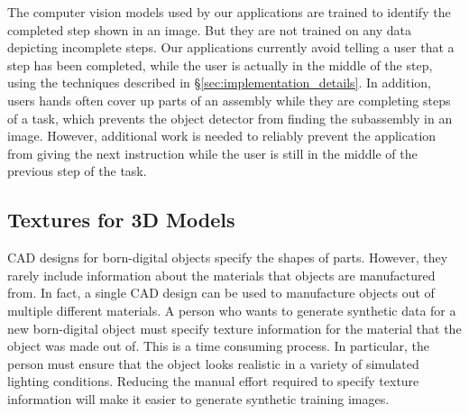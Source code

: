 The computer vision models used by our applications are trained to identify the
completed step shown in an image.
But they are not trained on any data depicting incomplete steps.
Our applications currently avoid telling a user that a step has been completed,
while the user is actually in the middle of the step, using the techniques
described in \S\ref{sec:implementation_details}.
In addition, users hands often cover up parts of an assembly while they
are completing steps of a task, which prevents the object detector from finding
the subassembly in an image.
However, additional work is needed to reliably prevent the application from
giving the next instruction while the user is still in the middle of the
previous step of the task.

\subsection{Textures for 3D Models}

CAD designs for born-digital objects specify the shapes of parts.
However, they rarely include information about the materials that objects are
manufactured from.
In fact, a single CAD design can be used to manufacture objects out of multiple
different materials.
A person who wants to generate synthetic data for a new born-digital object must
specify texture information for the material that the object was made out of.
This is a time consuming process.
In particular, the person must ensure that the object looks realistic in a
variety of simulated lighting conditions.
Reducing the manual effort required to specify texture information will make it
easier to generate synthetic training images.
